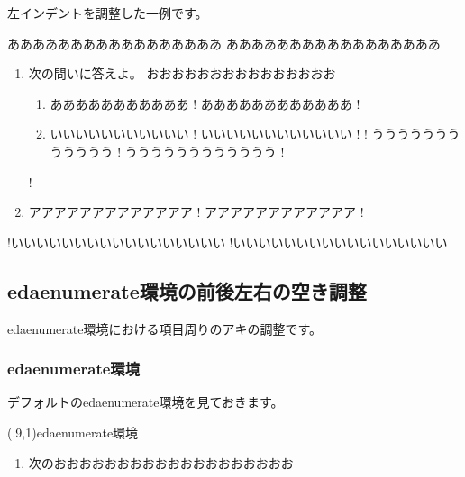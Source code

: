\documentclass[fleqn,a4j]{jarticle}
\begin{document}
左インデントを調整した一例です。

\begin{showpEx}{}
あああああああああああああああああ
あああああああああああああああああ
\begin{enumerate}[1.~]
  \item 次の問いに答えよ。
    おおおおおおおおおおおおおおお
    \begin{enumerate}[(1)]
!      \item あああああああああああ
!       ああああああああああああ
!      \item いいいいいいいいいいい
!       いいいいいいいいいいいい
!
!       うううううううううううう
!       うううううううううううう
!    \end{enumerate}
!  \item アアアアアアアアアアアアア
!   アアアアアアアアアアアア
!\end{enumerate}
!いいいいいいいいいいいいいいいいい
!いいいいいいいいいいいいいいいいい
\end{showpEx}

\subsection{\textsf{edaenumerate}環境の前後左右の空き調整}
\textsf{edaenumerate}環境における項目周りのアキの調整です。

\subsubsection{\textsf{edaenumerate}環境}
デフォルトの\textsf{edaenumerate}環境を見ておきます。
\begin{showEx}(.9,1){\textsf{edaenumerate}環境}
\begin{enumerate}[1.~]
  \item 次のおおおおおおおおおおおおおおおおおおお
\end{enumerate}
\end{showEx}
\end{document}
